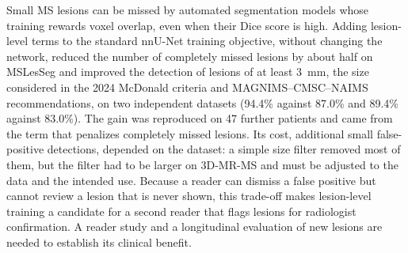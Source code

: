 Small MS lesions can be missed by automated segmentation models whose
training rewards voxel overlap, even when their Dice score is high. Adding
lesion-level terms to the standard nnU-Net training objective, without
changing the network, reduced the number of completely missed lesions by
about half on MSLesSeg and improved the detection of lesions of at least
3~mm, the size considered in the 2024 McDonald criteria and MAGNIMS--CMSC--NAIMS
recommendations, on two independent datasets (94.4\% against 87.0\% and
89.4\% against 83.0\%). The gain was reproduced on 47 further patients and
came from the term that penalizes completely missed lesions. Its cost,
additional small false-positive detections, depended on the dataset: a
simple size filter removed most of them, but the filter had to be larger
on 3D-MR-MS and must be adjusted to the data and the intended use. Because
a reader can dismiss a false positive but cannot review a lesion that is
never shown, this trade-off makes lesion-level training a candidate for a
second reader that flags lesions for radiologist confirmation. A reader
study and a longitudinal evaluation of new lesions are needed to establish
its clinical benefit.
